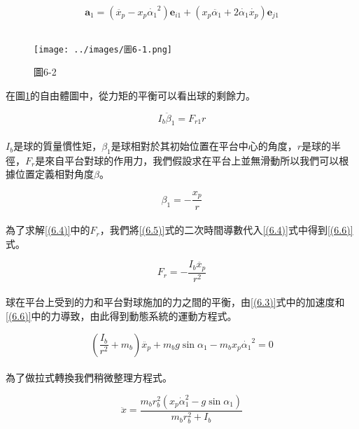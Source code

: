 \begin{equation}
\mathbf{a}_1= \left( \ddot{x_p} - x_p \dot{\alpha_1}^2 \right) \mathbf{e}_{i1} + \left( x_p \ddot{\alpha_1} + 2 \dot{\alpha_1} \dot{x_p} \right) \mathbf{e}_{j1}
\label{(6.3)}
\end{equation}\\

\begin{figure}[h]
\centering
\texttt{[image: ../images/圖6-1.png]}
\caption{圖6-2}
\label{fig:6-2}
\end{figure}

在圖\ref{fig:6-2}的自由體圖中，從力矩的平衡可以看出球的剩餘力。

\begin{equation}
I_b \ddot{\beta}_1=F_{r1} r
\label{(6.4)}
\end{equation} \\

\(I_b\)是球的質量慣性矩，\(\beta_1\)是球相對於其初始位置在平台中心的角度，\(r\)是球的半徑，\(F_r\)是來自平台對球的作用力，我們假設求在平台上並無滑動所以我們可以根據位置定義相對角度\(\beta\)。

\begin{equation}
\beta_1=-\frac{x_p}{r}
\label{(6.5)}
\end{equation} \\

為了求解\ref{(6.4)}中的\(F_r\)，我們將\ref{(6.5)}式的二次時間導數代入\ref{(6.4)}式中得到\ref{(6.6)}式。

\begin{equation}
F_r=-\frac{I_b \ddot{x_p}}{r^2}
\label{(6.6)}
\end{equation} \\

球在平台上受到的力和平台對球施加的力之間的平衡，由\ref{(6.3)}式中的加速度和\ref{(6.6)}中的力導致，由此得到動態系統的運動方程式。

\begin{equation}
\left(\frac{I_b}{r^2}+m_b\right) \ddot{x_p}+m_b g \sin \alpha_1-m_b x_p{\dot{\alpha_1}}^2=0
\label{(6.7)}
\end{equation} \\

為了做拉式轉換我們稍微整理方程式。

\begin{equation}
\ddot{x}=\frac{m_b r_b^2\left(x_p \dot{\alpha}_1^2-g \sin \alpha_1\right)}{m_b r_b^2+I_b}
\label{(6.8)}
\end{equation} \\

